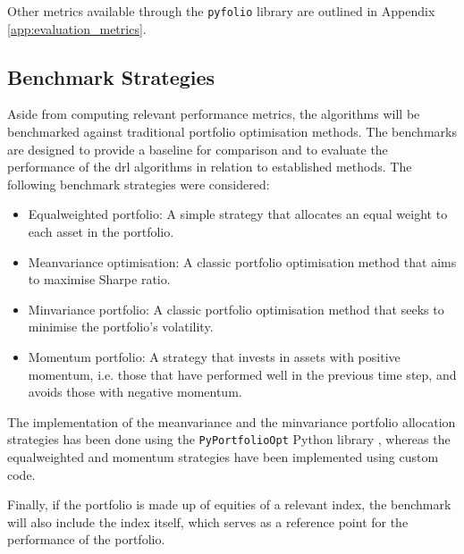 Other metrics available through the \texttt{pyfolio} library are outlined in Appendix \ref{app:evaluation_metrics}.

\subsection{Benchmark Strategies} \label{sec:benchmark-strategies}

Aside from computing relevant performance metrics, the algorithms will be benchmarked against traditional portfolio optimisation methods. The benchmarks are designed to provide a baseline for comparison and to evaluate the performance of the \acrshort{drl} algorithms in relation to established methods. The following benchmark strategies were considered:
\begin{itemize}
    \item Equal\-weighted portfolio: A simple strategy that allocates an equal weight to each asset in the portfolio.
    \item Mean\-variance optimisation: A classic portfolio optimisation method that aims to maximise Sharpe ratio. 
    \item Min\-variance portfolio: A classic portfolio optimisation method that seeks to minimise the portfolio's volatility. 
    \item Momentum portfolio: A strategy that invests in assets with positive momentum, i.e. those that have performed well in the previous time step, and avoids those with negative momentum.
\end{itemize}

The implementation of the mean\-variance and the min\-variance portfolio allocation strategies has been done using the \texttt{PyPortfolioOpt} Python library \cite{Martin2021}, whereas the equal\-weighted and momentum strategies have been implemented using custom code. 

Finally, if the portfolio is made up of equities of a relevant index, the benchmark will also include the index itself, which serves as a reference point for the performance of the portfolio. 
